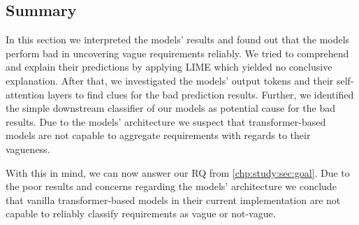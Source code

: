 \subsection{Summary}
\label{chp:study:sec:interpretation:subsec:summary}
In this section we interpreted the models' results and found out that the models perform bad in uncovering vague requirements reliably.
We tried to comprehend and explain their predictions by applying \ac{LIME} which yielded no conclusive explanation.
After that, we investigated the models' output tokens and their self-attention layers to find clues for the bad prediction results.
Further, we identified the simple downstream classifier of our models as potential cause for the bad results.
Due to the models' architecture we suspect that transformer-based models are not capable to aggregate requirements with regards to their vagueness.

With this in mind, we can now answer our \ac{RQ} from \cref{chp:study:sec:goal}.
Due to the poor results and concerns regarding the models' architecture we conclude that vanilla transformer-based models in their current implementation are not capable to reliably classify requirements as vague or not-vague.
